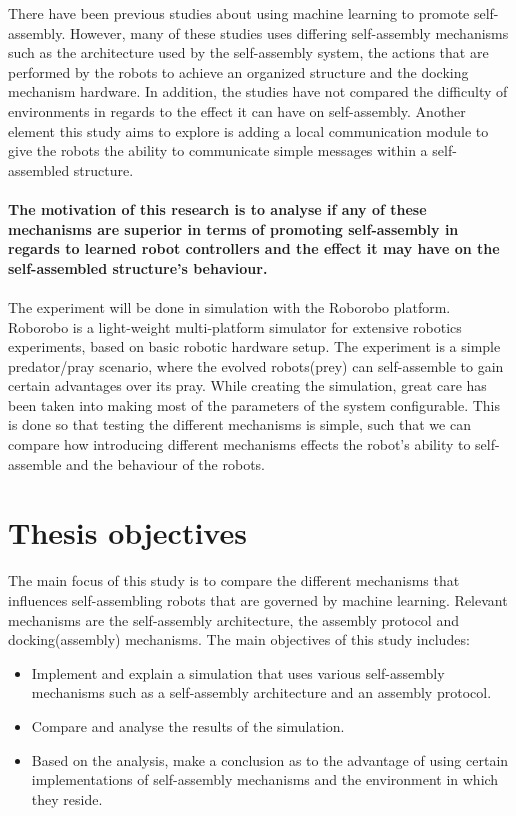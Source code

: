 There have been previous studies about using machine learning to promote self-assembly\cite{trianni_evolving_2004, montanier_adaptive_2014, li_co-evolution_2015}. 
However, many of these studies uses differing self-assembly mechanisms such as the architecture used by the self-assembly system, the actions that are performed by the robots to achieve an organized structure and the docking mechanism hardware.
In addition, the studies have not compared the difficulty of environments in regards to the effect it can have on self-assembly.
Another element this study aims to explore is adding a local communication module to give the robots the ability to communicate simple messages within a self-assembled structure.\\ \\
\textbf{The motivation of this research is to analyse if any of these mechanisms are superior in terms of promoting self-assembly in regards to learned robot controllers and the effect it may have on the self-assembled structure's behaviour.\\ \\}
The experiment will be done in simulation with the Roborobo platform. 
Roborobo is a light-weight multi-platform simulator for extensive robotics experiments, based on basic robotic hardware setup.
The experiment is a simple predator/pray scenario, where the evolved robots(prey) can self-assemble to gain certain advantages over its pray.
While creating the simulation, great care has been taken into making most of the parameters of the system configurable.
This is done so that testing the different mechanisms is simple, such that we can compare how introducing different mechanisms effects the robot's ability to self-assemble and the behaviour of the robots.

\section{Thesis objectives}
The main focus of this study is to compare the different mechanisms that influences self-assembling robots that are governed by machine learning. 
Relevant mechanisms are the self-assembly architecture, the assembly protocol and docking(assembly) mechanisms. 
The main objectives of this study includes:

\begin{itemize}

\item Implement and explain a simulation that uses various self-assembly mechanisms such as a self-assembly architecture and an assembly protocol.

\item Compare and analyse the results of the simulation. 

\item Based on the analysis, make a conclusion as to the advantage of using certain implementations of self-assembly mechanisms and the environment in which they reside.

\end{itemize}

